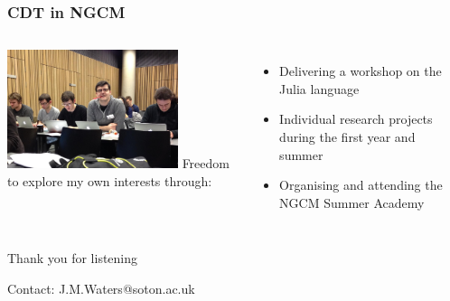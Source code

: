 \documentclass{beamer}
\begin{document}
\begin{frame}
	\frametitle{CDT in NGCM}
	\begin{columns}
		\column{5cm}
		\includegraphics[width=5cm]{Images/ngcm}
		\column{7cm}
		Freedom to explore my own interests through: \newline
		\begin{itemize}
			\item{Delivering a workshop on the Julia language}\newline
			\item{Individual research projects during the first year and summer}\newline
			\item{Organising and attending the NGCM Summer Academy}
		\end{itemize}
	\end{columns}
\end{frame}

\begin{frame}
	\begin{center}
		\huge{Thank you for listening}\vspace{8mm}
		
		\large{Contact: J.M.Waters@soton.ac.uk}
	\end{center}
\end{frame}
\end{document}
